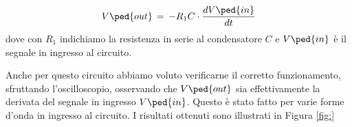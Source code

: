 \begin{equation}
        V\ped{out}\,=\,-R_1C \cdot \frac{dV\ped{in}}{dt}
\end{equation}
%
dove con $R_1$ indichiamo la resistenza in serie al condensatore $C$ e $V\ped{in}$ è il segnale in ingresso al circuito.

Anche per questo circuito abbiamo voluto verificarne il corretto funzionamento, sfruttando l'oscilloscopio, osservando che $V\ped{out}$ sia effettivamente la derivata del segnale in ingresso $V\ped{in}$. Questo è stato fatto per varie forme d'onda in ingresso al circuito. I risultati ottenuti sono illustrati in Figura \ref{fig:}